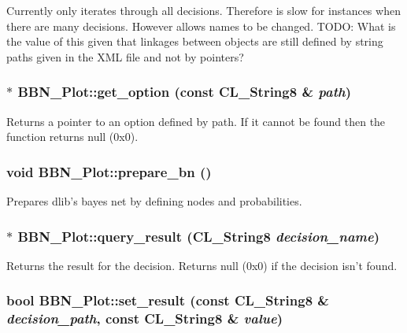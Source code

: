 Currently only iterates through all decisions. Therefore is slow for instances when there are many decisions. However allows names to be changed. TODO: What is the value of this given that linkages between objects are still defined by string paths given in the XML file and not by pointers? \hypertarget{classBBN__Plot_a8ad3137651f387777f10468d387c6ad6}{
\subsubsection[{get\_\-option}]{ $\ast$ BBN\_\-Plot::get\_\-option (const CL\_\-String8 \& {\em path})}}
\label{classBBN__Plot_a8ad3137651f387777f10468d387c6ad6}
Returns a pointer to an option defined by path. If it cannot be found then the function returns null (0x0). \hypertarget{classBBN__Plot_acc89676366edd3b07bfb9ec6d4bb61b5}{
\subsubsection[{prepare\_\-bn}]{\setlength{\rightskip}{0pt plus 5cm}void BBN\_\-Plot::prepare\_\-bn ()}}
\label{classBBN__Plot_acc89676366edd3b07bfb9ec6d4bb61b5}
Prepares dlib's bayes net by defining nodes and probabilities. \hypertarget{classBBN__Plot_a153f754321621e1ca25d7ce39a8f6107}{
\subsubsection[{query\_\-result}]{ $\ast$ BBN\_\-Plot::query\_\-result (CL\_\-String8 {\em decision\_\-name})}}
\label{classBBN__Plot_a153f754321621e1ca25d7ce39a8f6107}
Returns the result for the decision. Returns null (0x0) if the decision isn't found. \hypertarget{classBBN__Plot_a9b06ca52231b165a1fddad2b92cef7e2}{
\subsubsection[{set\_\-result}]{\setlength{\rightskip}{0pt plus 5cm}bool BBN\_\-Plot::set\_\-result (const CL\_\-String8 \& {\em decision\_\-path}, \/  const CL\_\-String8 \& {\em value})}}
